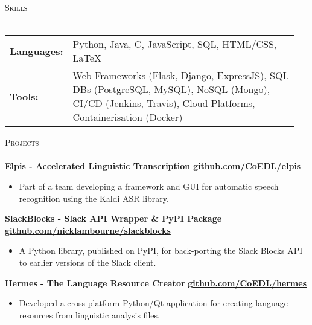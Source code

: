\documentclass[a4paper]{article}
\newcommand{\lineunder} {
    \vspace*{-8pt} \\
    \hspace*{-10pt} \hrulefill \\
}
\newcommand{\header} [1] {
    {\hspace*{-10pt}\vspace*{6pt} \textsc{#1}}
    \vspace*{-6pt} \lineunder
}
\newenvironment{singleitem}
{   \small
    \vspace{0pt}
    \begin{itemize}
    \setlength{\itemsep}{0pt}
    \setlength{\parskip}{0pt}
    \setlength{\parsep}{0pt}   }
{\end{itemize} \vspace{1pt}	}
\begin{document}
\vspace{0.5mm}
\header{Skills}
\vspace{1.5mm}
\begin{tabular}{p{0.12\linewidth}p{0.83\linewidth}}
	\textbf{Languages:} & Python, Java, C, JavaScript, SQL, HTML/CSS, \LaTeX \\
	\textbf{Tools:} & Web Frameworks (Flask, Django, ExpressJS), SQL DBs (PostgreSQL, MySQL), NoSQL (Mongo), CI/CD (Jenkins, Travis), Cloud Platforms, Containerisation (Docker)
\end{tabular}

\vspace{1.5mm}

\header{Projects}

\textbf{{Elpis - Accelerated Linguistic Transcription}} \hfill \textbf{\href{https://github.com/CoEDL/elpis}{github.com/CoEDL/elpis}}
\begin{singleitem}
	\item Part of a team developing a framework and GUI for automatic speech recognition using the Kaldi ASR library.
\end{singleitem}

\textbf{SlackBlocks - Slack API Wrapper \& PyPI Package} \hfill \textbf{\href{https://github.com/nicklambourne/slackblocks}{github.com/nicklambourne/slackblocks}}
\begin{singleitem}
	\item A Python library, published on PyPI, for back-porting the Slack Blocks API to earlier versions of the Slack client.
\end{singleitem}

\textbf{{Hermes - The Language Resource Creator}} \hfill \textbf{\href{https://github.com/CoEDL/hermes}{github.com/CoEDL/hermes}}
\begin{singleitem}
	\item Developed a cross-platform Python/Qt application for creating language resources from linguistic analysis files.
\end{singleitem}

\end{document}

